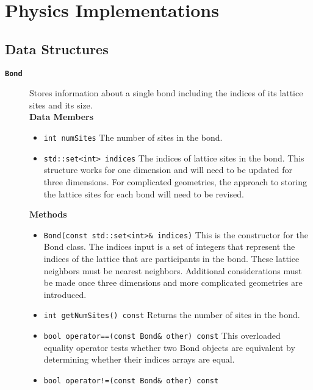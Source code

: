 
\section{Physics Implementations}
\label{sec:physics_implementations}


\subsection{Data Structures}
\begin{description}
  \item[\texttt{\textbf{Bond}}]
    Stores information about a single bond including the indices of its lattice
    sites and its size. \\
    \textbf{Data Members}
    \begin{itemize}
      \item \texttt{int numSites}
        The number of sites in the bond.
      \item \texttt{std::set<int> indices}
        The indices of lattice sites in the bond.
        This structure works for one dimension and will need to be updated for
        three dimensions.
        For complicated geometries, the approach to storing the lattice sites 
        for each bond will need to be revised.
    \end{itemize}
    \textbf{Methods}
    \begin{itemize}
      \item \texttt{Bond(const std::set<int>\& indices)}
        This is the constructor for the Bond class.
        The indices input is a set of integers that represent the indices of the
        lattice that are participants in the bond. 
        These lattice neighbors must be nearest neighbors. 
        Additional considerations must be made once three dimensions and more 
        complicated geometries are introduced.
      \item \texttt{int getNumSites() const}
        Returns the number of sites in the bond. 
      \item \texttt{bool operator==(const Bond\& other) const}
        This overloaded equality operator tests whether two Bond objects are  
        equivalent by determining whether their indices arrays are equal.
      \item \texttt{bool operator!=(const Bond\& other) const}

\end{itemize}
\end{description}
